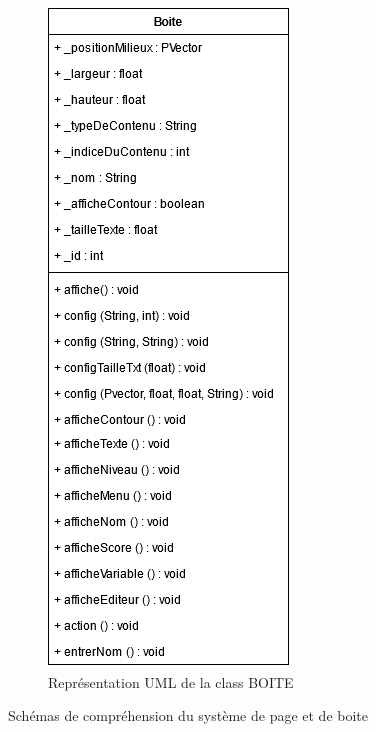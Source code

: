 \documentclass[10pt,a4paper]{article}
\begin{document}
\begin{figure}[h!]
\begin{subfigure}{.25\textwidth}
	\includegraphics[width=.9\linewidth]{Boite.png}
  	\caption{Représentation UML de la class BOITE}
  	\label{fig3}
\end{subfigure}
\caption{Schémas de compréhension du système de page et de boite}
\label{fig7}
\end{figure}
\end{document}
